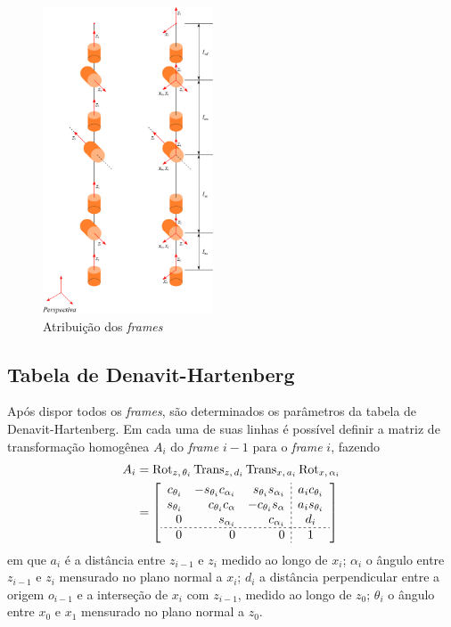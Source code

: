 \begin{figure}[ht]
    \centering
    \includegraphics[width=0.45\textwidth]{Imagem/x.eps}
    \caption{Atribuição dos \textit{frames}}
    \label{fig:frames}
\end{figure}

\subsection{Tabela de Denavit-Hartenberg}

Após dispor todos os \textit{frames}, são determinados os parâmetros da tabela de Denavit-Hartenberg. Em cada uma de suas linhas é possível definir a matriz de transformação homogênea $A_i$ do \textit{frame} $i-1$ para o \textit{frame} $i$, fazendo  
\begin{align*}
  \setlength{\dashlinegap}{2pt}
    A_i
    &= \Rot_{z,\,\theta_i} \Trans_{z,\,d_i} \Trans_{x,\,a_i} \Rot_{x,\,\alpha_i} \\
    &=
    \left[ 
    \begin{array}{rrr;{2pt/2pt}c}
        c_{\theta_i} & -s_{\theta_i}c_{\alpha_i} & s_{\theta_i} s_{\alpha_i} & a_i c_{\theta_i} \\
        s_{\theta_i} & c_{\theta_i} c_{\alpha} & -c_{\theta_i} s_{\alpha} & a_i s_{\theta_i} \\
        0 & s_{\alpha_i} & c_{\alpha_i} & d_i \\
        \hdashline[2pt/2pt]
        0 & 0 & 0 & 1
    \end{array}
    \right]
\end{align*}
em que $a_i$ é a distância entre $z_{i-1}$ e $z_i$ medido ao longo de $x_i$; $\alpha_i$ o ângulo entre $z_{i-1}$ e $z_i$ mensurado no plano normal a $x_i$;  $d_i$ a distância perpendicular entre a origem $o_{i-1}$ e a interseção de $x_i$ com $z_{i-1}$, medido ao longo de $z_0$; $\theta_i$ o ângulo  entre $x_0$ e $x_1$ mensurado no plano normal a $z_0$.

